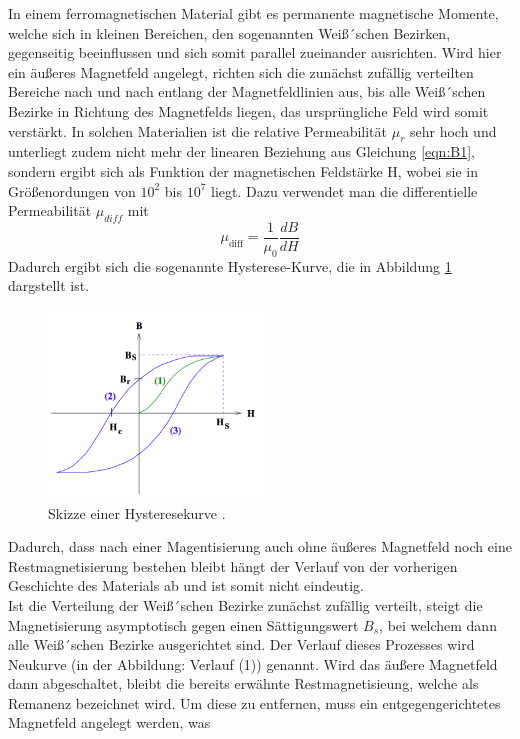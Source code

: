 \noindent In einem ferromagnetischen Material gibt es permanente magnetische Momente,
welche sich in kleinen Bereichen, den sogenannten Weiß´schen Bezirken, gegenseitig
beeinflussen und sich somit parallel zueinander ausrichten. Wird hier ein äußeres
Magnetfeld angelegt, richten sich die zunächst zufällig verteilten Bereiche nach und
nach entlang
der Magnetfeldlinien aus, bis alle Weiß´schen Bezirke in Richtung des Magnetfelds liegen,
das ursprüngliche Feld wird somit verstärkt.
In solchen Materialien ist die relative Permeabilität $\mu_r $ sehr hoch und unterliegt zudem
nicht mehr der linearen Beziehung aus Gleichung \ref{eqn:B1}, sondern ergibt sich als
Funktion der magnetischen Feldstärke H, wobei sie in Größenordungen von
$10^2$ bis $10^7$ liegt. Dazu verwendet man die differentielle Permeabilität
$\mu_{diff}$ mit
\begin{equation}
  \mu_{\text{diff}} = \frac{1}{\mu_0}\frac{dB}{dH}
  \label{eqn:mur}
\end{equation}
\noindent Dadurch ergibt sich die
sogenannte Hysterese-Kurve, die in Abbildung \ref{fig:hysterese}
dargstellt ist.
\begin{figure}[H]
  \centering
  \includegraphics[height=5cm]{hysterese.png}
  \caption{Skizze einer Hysteresekurve \cite{skript}.}
  \label{fig:hysterese}
\end{figure}
\noindent Dadurch, dass nach einer Magentisierung auch ohne äußeres Magnetfeld
noch eine Restmagnetisierung bestehen bleibt hängt der Verlauf von der vorherigen Geschichte
des Materials ab und ist somit nicht eindeutig.
\\
\noindent Ist die Verteilung der Weiß´schen Bezirke zunächst zufällig verteilt,
steigt die Magnetisierung asymptotisch gegen einen Sättigungswert $B_s$, bei welchem dann alle
Weiß´schen Bezirke ausgerichtet sind. Der Verlauf dieses Prozesses wird Neukurve
(in der Abbildung: Verlauf (1)) genannt. Wird das äußere Magnetfeld dann abgeschaltet,
bleibt die bereits erwähnte Restmagnetisieung, welche als Remanenz bezeichnet wird.
Um diese zu entfernen, muss ein entgegengerichtetes Magnetfeld angelegt werden, was

